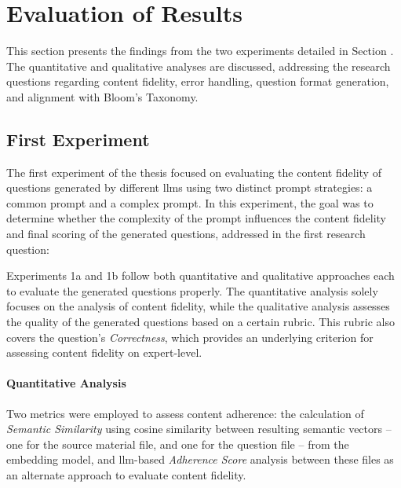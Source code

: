 \section{Evaluation of Results} \label{sec:evaluation}

This section presents the findings from the two experiments detailed in Section . The quantitative and qualitative analyses are discussed, addressing the research questions regarding content fidelity, error handling, question format generation, and alignment with Bloom's Taxonomy.

\subsection{First Experiment}
\label{sec:first-experiment}

The first experiment of the thesis focused on evaluating the content fidelity of questions generated by different \acp{llm} using two distinct prompt strategies: a common prompt and a complex prompt. In this experiment, the goal was to determine whether the complexity of the prompt influences the content fidelity and final scoring of the generated questions, addressed in the first research question:

 Experiments 1a and 1b follow both quantitative and qualitative approaches each to evaluate the generated questions properly. The quantitative analysis solely focuses on the analysis of content fidelity, while the qualitative analysis assesses the quality of the generated questions based on a certain rubric. This rubric also covers the question's \textit{Correctness}, which provides an underlying criterion for assessing content fidelity on expert-level.

\paragraph*{Quantitative Analysis} 

Two metrics were employed to assess content adherence: the calculation of \textit{Semantic Similarity} using cosine similarity between resulting semantic vectors -- one for the source material file, and one for the question file -- from the embedding model, and \ac{llm}-based \textit{Adherence Score} analysis between these files as an alternate approach to evaluate content fidelity.

